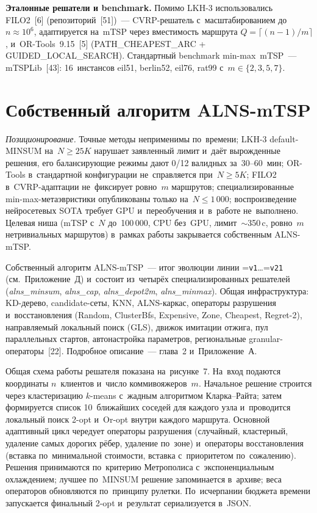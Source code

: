 \documentclass[a4paper,14pt]{extreport}
\makeatletter
\let\old@texttt\texttt
\renewcommand{\texttt}[1]{{\sloppy\hyphenchar\font=\m@ne\old@texttt{#1}}}
\makeatother
\begin{document}
\textbf{Эталонные решатели и benchmark.} Помимо LKH-3 использовались FILO2~[6] (репозиторий~[51])~--- CVRP-решатель с~масштабированием до~$n\approx 10^6$, адаптируется на~mTSP через вместимость маршрута $Q=\lceil(n{-}1)/m\rceil$, и~OR-Tools~9.15~[5] (PATH\_CHEAPEST\_ARC + GUIDED\_LOCAL\_SEARCH). Стандартный benchmark min-max~mTSP~--- mTSPLib~[43]: 16~инстансов eil51, berlin52, eil76, rat99 с~$m\in\{2,3,5,7\}$.

\section{Собственный алгоритм ALNS-mTSP}

\textit{Позиционирование.} Точные методы неприменимы по~времени; LKH-3 default-MINSUM на~$N\geq 25K$ нарушает заявленный лимит и~даёт вырожденные решения, его балансирующие режимы дают 0/12 валидных за~30--60~мин; OR-Tools в~стандартной конфигурации не~справляется при~$N\geq 5K$; FILO2 в~CVRP-адаптации не~фиксирует ровно~$m$ маршрутов; специализированные min-max-метаэвристики опубликованы только на~$N\leq 1\,000$; воспроизведение нейросетевых SOTA требует GPU и~переобучения и~в~работе не~выполнено. Целевая ниша (mTSP с~$N$ до~100\,000, CPU без~GPU, лимит~$\sim$350\,c, ровно~$m$ нетривиальных маршрутов) в~рамках работы закрывается собственным ALNS-mTSP.

Собственный алгоритм ALNS-mTSP~--- итог эволюции линии \texttt{v1}\dots\texttt{v21} (см.~Приложение~Д) и~состоит из~четырёх специализированных решателей (\emph{alns\_minsum}, \emph{alns\_cap}, \emph{alns\_depot2m}, \emph{alns\_minmax}). Общая инфраструктура: KD-дерево, candidate-сеты, KNN, ALNS-каркас, операторы разрушения и~восстановления (Random, ClusterBfs, Expensive, Zone, Cheapest, Regret-2), направляемый локальный поиск (GLS), движок имитации отжига, пул параллельных стартов, автонастройка параметров, региональные granular-операторы~[22]. Подробное описание~--- глава~2 и~Приложение~А.

Общая схема работы решателя показана на~рисунке~7. На~вход подаются координаты $n$~клиентов и~число коммивояжеров~$m$. Начальное решение строится через кластеризацию $k$-means с~жадным алгоритмом Кларка--Райта; затем формируется список 10~ближайших соседей для каждого узла и~проводится локальный поиск 2-opt и~Or-opt внутри каждого маршрута. Основной адаптивный цикл чередует операторы разрушения (случайный, кластерный, удаление самых дорогих рёбер, удаление по~зоне) и~операторы восстановления (вставка по~минимальной стоимости, вставка с~приоритетом по~сожалению). Решения принимаются по~критерию Метрополиса с~экспоненциальным охлаждением; лучшее по~MINSUM решение запоминается в~архиве; веса операторов обновляются по~принципу рулетки. По~исчерпании бюджета времени запускается финальный 2-opt и~результат сериализуется в~JSON.
\end{document}
